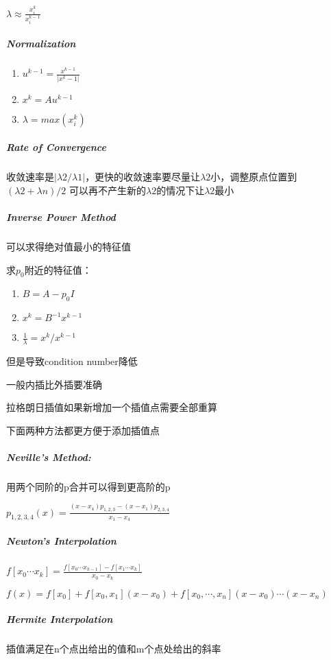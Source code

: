\documentclass[]{article}
\let\oldsubparagraph\subparagraph
\renewcommand{\subparagraph}[1]{\oldsubparagraph{#1}\mbox{}}
\begin{document}
\begin{multicols}{3}
\(\lambda \approx \frac{x_i^k}{x_i^{k-1}}\)

\subparagraph{Normalization}\label{header-c329}

\begin{enumerate}
\def\labelenumi{\arabic{enumi}.}
\item
  \( u^{k-1} = \frac{x^{k-1}}{|x^k-1|}\)
\item
  \(x^{k} = Au^{k-1}\)
\item
  \(\lambda = max(x^k_i)\)
\end{enumerate}

\subparagraph{Rate of Convergence}\label{header-c341}

收敛速率是\(|\lambda 2 / \lambda 1|\)，更快的收敛速率要尽量让\(\lambda 2\)小，调整原点位置到\((\lambda 2 + \lambda n) / 2\)
可以再不产生新的\(\lambda2\)的情况下让\(\lambda 2 \)最小

\subparagraph{Inverse Power Method}\label{header-c346}

可以求得绝对值最小的特征值

求\(p_0\)附近的特征值：

\begin{enumerate}
\def\labelenumi{\arabic{enumi}.}
\item
  \(B= A- p_0  I\) 
\item
  \(x^k = B^{-1}x^{k-1}\)
\item
  \(\frac 1 \lambda = x^k / x^{k-1}\)
\end{enumerate}

但是导致condition number降低


一般内插比外插要准确

拉格朗日插值如果新增加一个插值点需要全部重算

下面两种方法都更方便于添加插值点

\subparagraph{Neville's Method:}\label{header-c373}

用两个同阶的p合并可以得到更高阶的p

\(p_{1,2,3,4}(x) = \frac{(x -x_4)p_{1,2,3} - (x - x_1)p_{2,3,4}}{x_1 - x_4}\)

\subparagraph{Newton's Interpolation}\label{header-c380}

\( f[x_0 \cdots x_k] =\frac{ f[x_ 0 \cdots x_{k-1}] - f[x_1 \cdots x_k] }{x_0-x_k}\)

\( f(x) = f[x_0] + f[x_0,x_1] (x-x_0)+f[x_ 0 ,\cdots, x_n](x-x_0) \cdots (x - x_n)\)

\subparagraph{Hermite Interpolation}\label{header-c391}

插值满足在n个点出给出的值和m个点处给出的斜率


\end{multicols}
\end{document}
